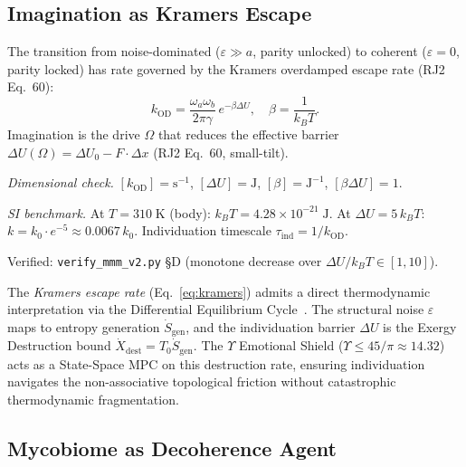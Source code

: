 \subsection{Imagination as Kramers Escape}

\begin{theorem}
\label{thm:kramers}
The transition from noise-dominated ($\varepsilon \gg a$, parity unlocked)
to coherent ($\varepsilon = 0$, parity locked) has rate governed by the
Kramers overdamped escape rate (RJ2 Eq.~60):
\begin{equation}
  k_\mathrm{OD} = \frac{\omega_a\omega_b}{2\pi\gamma}\,e^{-\beta\Delta U},
  \quad \beta = \frac{1}{k_B T}.
  \label{eq:kramers}
\end{equation}
Imagination is the drive $\Omega$ that reduces the effective barrier
$\Delta U(\Omega) = \Delta U_0 - F\cdot\Delta x$ (RJ2 Eq.~60, small-tilt).

\emph{Dimensional check.}
$[k_\mathrm{OD}] = \mathrm{s^{-1}}$, $[\Delta U] = \mathrm{J}$,
$[\beta] = \mathrm{J^{-1}}$, $[\beta\Delta U] = 1$. \checkmark

\emph{SI benchmark.}
At $T = 310\;\mathrm{K}$ (body): $k_BT = 4.28\times10^{-21}\;\mathrm{J}$.
At $\Delta U = 5\,k_BT$: $k = k_0\cdot e^{-5} \approx 0.0067\,k_0$.
Individuation timescale $\tau_\mathrm{ind} = 1/k_\mathrm{OD}$.

Verified: \texttt{verify\_mmm\_v2.py} \S D (monotone decrease over
$\Delta U/k_BT \in [1, 10]$).
\end{theorem}

\begin{remark}
The \emph{Kramers escape rate} (Eq.~\ref{eq:kramers}) admits a direct thermodynamic
interpretation via the Differential Equilibrium Cycle~\cite{lc}. The structural
noise $\varepsilon$ maps to entropy generation $\dot{S}_{\mathrm{gen}}$, and the
individuation barrier $\Delta U$ is the Exergy Destruction bound
$\dot{X}_{\mathrm{dest}} = T_0 \dot{S}_{\mathrm{gen}}$. The $\Upsilon$ Emotional Shield
($\Upsilon \leq 45/\pi \approx 14.32$) acts as a State-Space MPC on this destruction rate,
ensuring individuation navigates the non-associative topological friction
without catastrophic thermodynamic fragmentation.
\end{remark}

\subsection{Mycobiome as Decoherence Agent}


